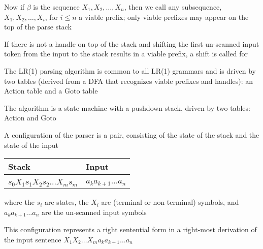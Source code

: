 \documentclass[8pt,a4paper,compress,handout]{beamer}
\begin{document}
\begin{frame}[fragile]
\pause

Now if $\beta$ is the sequence $X_1, X_2, \dots , X_n$, then we call any subsequence, $X_1, X_2, \dots , X_i$, for $i \leq n$ a viable prefix; only viable prefixes may appear on the top of the parse stack

\pause
\bigskip

If there is not a handle on top of the stack and shifting the first un-scanned input token from the input to the stack results in a viable prefix, a shift is called for

\pause
\bigskip

The LR(1) parsing algorithm is common to all LR(1) grammars and is driven by two tables (derived from a DFA that recognizes viable prefixes and handles): an Action table and a Goto table

\pause
\bigskip

The algorithm is a state machine with a pushdown stack, driven by two tables: Action and Goto

\pause
\bigskip

A configuration of the parser is a pair, consisting of the state of the stack and the state of the input

\begin{table}[H]
\begin{tabular}{ll}
Stack & Input \\ \hline \\
$s_0 X_1 s_1 X_2 s_2 \dots X_m s_m$ & $a_k a_{k +1} \dots a_n$
\end{tabular}
\end{table}

\noindent where the $s_i$ are states, the $X_i$ are (terminal or non-terminal) symbols, and $a_k a_{k +1} \dots a_n$ are the un-scanned input symbols

\pause
\bigskip

This configuration represents a right sentential form in a right-most derivation of the input sentence $X_1X_2 \dots X_m a_k a_{k +1} \dots a_n$
\end{frame}
\end{document}
